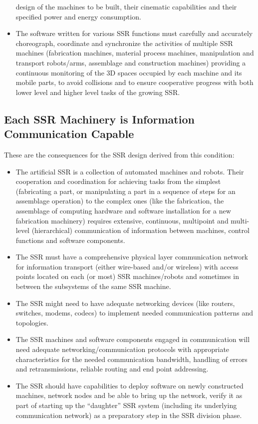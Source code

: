 \begin{itemize}
design of the machines to be built, their cinematic capabilities and
their specified power and energy consumption.
\item The software written for various SSR functions must carefully and
accurately choreograph, coordinate and synchronize the activities of
multiple SSR machines (fabrication machines, material process machines,
manipulation and transport robots/arms, assemblage and construction
machines) providing a continuous monitoring of the 3D spaces occupied
by each machine and its mobile parts, to avoid collisions and to ensure
cooperative progress with both lower level and higher level tasks of
the growing SSR.
\end{itemize}

\subsection[Each SSR Machinery is Information Communication
Capable]{Each SSR Machinery is Information Communication Capable}

\hypertarget{RefHeading3134306210128}{}These are the consequences for
the SSR design derived from this condition:

\begin{itemize}
\item The artificial SSR is a collection of automated machines and
robots. Their cooperation and coordination for achieving tasks from the
simplest (fabricating a part, or manipulating a part in a sequence of
steps for an assemblage operation) to the complex ones (like the
fabrication, the assemblage of computing hardware and software
installation for a new fabrication machinery) requires extensive,
continuous, multipoint and multi-level (hierarchical) communication of
information between machines, control functions and software
components.
\item The SSR must have a comprehensive physical layer communication
network for information transport (either wire-based and/or wireless)
with access points located on each (or most) SSR machines/robots and
sometimes in between the subsystems of the same SSR machine.
\item The SSR might need to have adequate networking devices (like
routers, switches, modems, codecs) to implement needed communication
patterns and topologies.
\item The SSR machines and software components engaged in communication
will need adequate networking/communication protocols with appropriate
characteristics for the needed communication bandwidth, handling of
errors and retransmissions, reliable routing and end point addressing.
\item The SSR should have capabilities to deploy software on newly
constructed machines, network nodes and be able to bring up the
network, verify it as part of starting up the “daughter” SSR system
(including its underlying communication network) as a preparatory step
in the SSR division phase.
\end{itemize}

